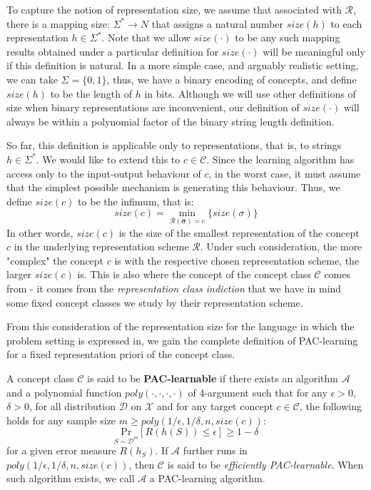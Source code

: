 To capture the notion of representation size, we assume that associated with $\bm{\mathcal{R}}$, there is a mapping size: $\Sigma^{*}\to N$ that assigns a natural number $size(h)$ to each representation $h\in \Sigma^{*}$. Note that we allow $size(\cdot)$ to be any such mapping results obtained under a particular definition for $size(\cdot)$ will be meaningful only if this definition is natural. In a more simple case, and arguably realistic setting, we can take $\Sigma=\{0,1\}$, thus, we have a binary encoding of concepts, and define $size(h)$ to be the length of $h$ in bits. Although we will use other definitions of size when binary representations are inconvenient, our definition of $size(\cdot)$ will always be within a polynomial factor of the binary string length definition.

So far, this definition is applicable only to representations, that is, to strings $h\in \Sigma^{*}$. We would like to extend this to $c\in \mathcal{C}$. Since the learning algorithm has access only to the input-output behaviour of $c$, in the worst case, it must assume that the simplest possible mechanism is generating this behaviour. Thus, we define $size(c)$ to be the infimum, that is: \begin{equation*}
    size(c) = \min_{\bm{\mathcal{R}(\sigma)}=c}\{size(\sigma)\}
\end{equation*}
In other words, $size(c)$ is the size of the smallest representation of the concept $c$ in the underlying representation scheme $\bm{\mathcal{R}}$. Under such consideration, the more "complex" the concept $c$ is with the respective chosen representation scheme, the larger $size(c)$ is. This is also where the concept of the concept class $\mathcal{C}$ comes from - it comes from the \textit{representation class indiction} that we have in mind some fixed concept classes we study by their representation scheme. 

From this consideration of the representation size for the language in which the problem setting is expressed in, we gain the complete definition of PAC-learning for a fixed representation priori of the concept class. 

\begin{definition}
    A concept class $\mathcal{C}$ is said to be \textbf{PAC-learnable} if there exists an algorithm $\mathcal{A}$ and a polynomial function $poly(\cdot,\cdot,\cdot,\cdot)$ of 4-argument such that for any $\epsilon>0$, $\delta>0$, for all distribution $\mathcal{D}$ on $\mathcal{X}$ and for any target concept $c\in\mathcal{C}$, the following holds for any sample size $m\geq poly(1/\epsilon,1/\delta,n,size(c))$: $$\underset{S\sim \mathcal{D}^{m}}{\mathrm{Pr}}\left[ R(h(S))\leq \epsilon \right]\geq 1-\delta$$
    for a given error measure $R(h_{S})$. If $\mathcal{A}$ further runs in $poly(1/\epsilon,1/\delta,n,size(c))$, then $\mathcal{C}$ is said to be \textit{efficiently PAC-learnable}. When such algorithm exists, we call $\mathcal{A}$ a PAC-learning algorithm. 
\end{definition}




